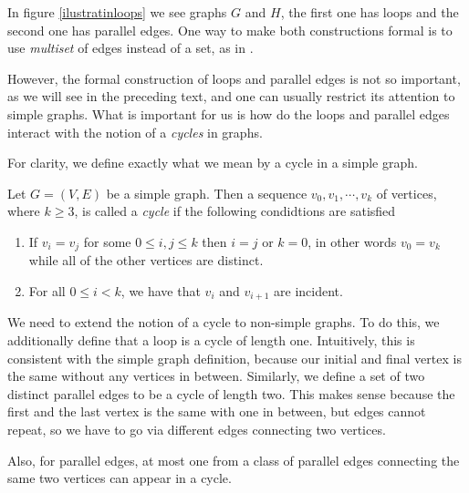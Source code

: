 In figure \ref{ilustratinloops} we see graphs $G$ and $H$, the first one has loops and the second one has parallel edges. One way to make both constructions formal is to use \textit{multiset} of edges instead of a set, as in \cite[4]{oxley1}.

However, the formal construction of loops and parallel edges is not so important, as we will see in the preceding text, and one can usually restrict its attention to simple graphs. What is important for us is how do the loops and parallel edges interact with the notion of a \textit{cycles} in graphs. 

For clarity, we define exactly what we mean by a cycle in a simple graph.

\begin{defn}
    Let $G = (V,E)$ be a simple graph. Then a sequence $v_0, v_1, \cdots, v_k$ of vertices, where $k\geq 3$, is called a \textit{cycle} if the following condidtions are satisfied
    
    \begin{enumerate}

        \item If $v_i = v_j$ for some $0 \leq i,j \leq k$ then $i = j$ or $k = 0$, in other words $v_0 = v_k$ while all of the other vertices are distinct. 
        
        \item For all $0\leq i < k$, we have that $v_i$ and $v_{i+1}$ are incident.
    \end{enumerate}
\end{defn}

We need to extend the notion of a cycle to non-simple graphs. To do this, we additionally define that a loop is a cycle of length one. Intuitively, this is consistent with the simple graph definition, because our initial and final vertex is the same without any vertices in between. Similarly, we define a set of two distinct parallel edges to be a cycle of length two. This makes sense because the first and the last vertex is the same with one in between, but edges cannot repeat, so we have to go via different edges connecting two vertices.





Also, for parallel edges, at most one from a class of parallel edges connecting the same two vertices can appear in a cycle.


